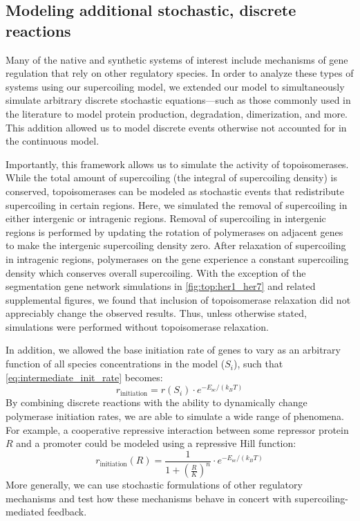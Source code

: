 \documentclass[11pt]{article}
\begin{document}
\subsection{Modeling additional stochastic, discrete reactions}
Many of the native and synthetic systems of interest include mechanisms of gene regulation that rely on other regulatory species. In order to analyze these types of systems using our supercoiling model, we extended our model to simultaneously simulate arbitrary discrete stochastic equations---such as those commonly used in the literature to model protein production, degradation, dimerization, and more. This addition allowed us to model discrete events otherwise not accounted for in the continuous model.

Importantly, this framework allows us to simulate the activity of topoisomerases. While the total amount of supercoiling (the integral of supercoiling density) is conserved, topoisomerases can be modeled as stochastic events that redistribute supercoiling in certain regions. Here, we simulated the removal of supercoiling in either intergenic or intragenic regions. Removal of supercoiling in intergenic regions is performed by updating the rotation of polymerases on adjacent genes to make the intergenic supercoiling density zero. After relaxation of supercoiling in intragenic regions, polymerases on the gene experience a constant supercoiling density which conserves overall supercoiling. With the exception of the segmentation gene network simulations in \cref{fig:top:her1_her7} and related supplemental figures, we found that inclusion of topoisomerase relaxation did not appreciably change the observed results. Thus, unless otherwise stated, simulations were performed without topoisomerase relaxation.

In addition, we allowed the base initiation rate of genes to vary as an arbitrary function of all species concentrations in the model (\(S_i\)), such that \cref{eq:intermediate_init_rate} becomes:
\begin{equation}
    r_\text{initiation} = r(S_i) \cdot e^{- E_\text{sc} / (k_B T)}
\label{eq:final_init_rate}
\end{equation}
By combining discrete reactions with the ability to dynamically change polymerase initiation rates, we are able to simulate a wide range of phenomena.
For example, a cooperative repressive interaction between some repressor protein \(R\) and a promoter could be modeled using a repressive Hill function:
\begin{equation*}
    r_\text{initiation}(R) = \frac{1}{1 + \left(\frac{R}{K}\right)^n} \cdot e^{-E_\text{sc} / (k_B T)}
\end{equation*}
More generally, we can use stochastic formulations of other regulatory mechanisms and test how these mechanisms behave in concert with supercoiling-mediated feedback.
\end{document}
